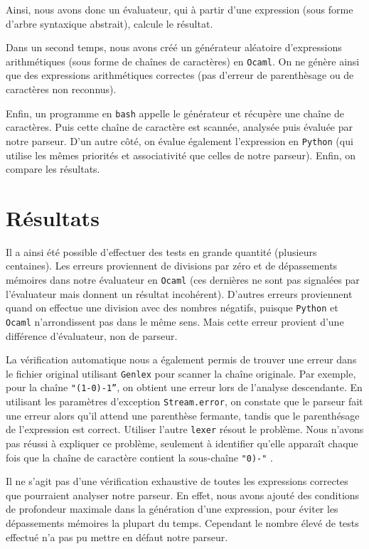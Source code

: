 \documentclass[11pt]{article}
\begin{document}
Ainsi, nous avons donc un évaluateur, qui à partir d'une expression (sous forme d'arbre syntaxique abstrait), calcule le résultat.

Dans un second temps, nous avons créé un générateur aléatoire d'expressions arithmétiques (sous forme de chaînes de caractères) en \texttt{Ocaml}. On ne génère ainsi que des expressions arithmétiques correctes (pas d'erreur de parenthèsage ou de caractères non reconnus).




Enfin, un programme en \texttt{bash} appelle le générateur et récupère une chaîne de caractères. Puis cette chaîne de caractère est scannée, analysée puis évaluée par notre parseur. D'un autre côté, on évalue également l'expression en \texttt{Python} (qui utilise les mêmes priorités et associativité que celles de notre parseur). Enfin, on compare les résultats.

\section{Résultats}

Il a ainsi été possible d'effectuer des tests en grande quantité (plusieurs centaines).
Les erreurs proviennent de divisions par zéro et de dépassements mémoires dans notre évaluateur en \texttt{Ocaml} (ces dernières ne sont pas signalées par l'évaluateur mais donnent un résultat incohérent). D'autres erreurs proviennent quand on effectue une division avec des nombres négatifs, puisque \texttt{Python} et \texttt{Ocaml} n'arrondissent pas dans le même sens. Mais cette erreur provient d'une différence d'évaluateur, non de parseur.

La vérification automatique nous a également permis de trouver une erreur dans le fichier original utilisant \texttt{Genlex} pour scanner la chaîne originale. Par exemple, pour la chaîne \texttt{"(1-0)-1''}, on obtient une erreur lors de l'analyse descendante. En utilisant les paramètres d'exception \texttt{Stream.error}, on constate que le parseur fait une erreur alors qu'il attend une parenthèse fermante, tandis que le parenthésage de l'expression est correct. Utiliser l'autre \texttt{lexer} résout le problème. Nous n'avons pas réussi à expliquer ce problème, seulement à identifier qu'elle apparaît chaque fois que la chaîne de caractère contient la sous-chaîne \texttt{"0)-"} .


Il ne s'agit pas d'une vérification exhaustive de toutes les expressions correctes que pourraient analyser notre parseur. En effet, nous avons ajouté des conditions de profondeur maximale dans la génération d'une expression, pour éviter les dépassements mémoires la plupart du temps. Cependant le nombre élevé de tests effectué n'a pas pu mettre en défaut notre parseur. 
\end{document}
